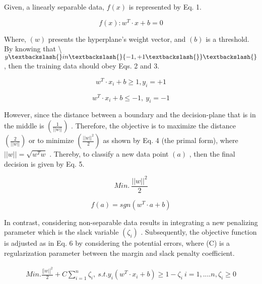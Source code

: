 \documentclass{article}
\begin{document}
Given, a linearly separable data, $f(x)$ is represented by Eq. 1.

\begin{equation}
f(x):w^{T}\cdot x+b=0
\end{equation}



Where, $(w)$ presents the hyperplane’s weight vector, and $(b)$ is a threshold. By knowing that \textbackslash{}$y\textbackslash{}in\textbackslash{}{-1,+1\textbackslash{}}\textbackslash{}$ , then the training data should obey Eqs. 2 and 3.

\begin{equation}
w^{T}\cdot x_{i}+b\geq1,y_{i}=+1
\end{equation}



\begin{equation}
w^{T}\cdot x_{i}+b\leq-1,~y_{i}=-1
\end{equation}



However, since the distance between a boundary and the decision-plane that is in the middle is $\left({\frac{1}{\left|\left|w\right|\right|}}\right)$ . Therefore, the objective is to maximize the distance $\left({\frac{2}{\left|\left|w\right|\right|}}\right)$ or to minimize $\left({\frac{||w||^{2}}{2}}\right)$ as shown by Eq. 4 (the primal form), where $||w||=\sqrt{w^{T}w}$ . Thereby, to classify a new data point $(a)$ , then the final decision is given by Eq. 5.

\begin{equation}
M i n.~\frac{||w||^{2}}{2}
\end{equation}



\begin{equation}
f(a)=s g n(w^{T}\cdot a+b)
\end{equation}



In contrast, considering non-separable data results in integrating a new penalizing parameter which is the slack variable $(\zeta_{i})$ . Subsequently, the objective function is adjusted as in Eq. 6 by considering the potential errors, where (C) is a regularization parameter between the margin and slack penalty coefficient.

\begin{equation}
\begin{array}{c}{{M i n.\frac{\lvert|w\rvert|^{2}}{2}+C\displaystyle\sum_{i=1}^{n}\zeta_{i},}}\ {{s.t.y_{i}(w^{T}\cdot x_{i}+b)\geq1-\zeta_{i}}}\ {{i=1,....n,\zeta_{i}\geq0}}\end{array}
\end{equation}
\end{document}

